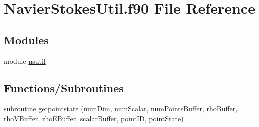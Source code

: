 \hypertarget{NavierStokesUtil_8f90}{}\section{Navier\+Stokes\+Util.\+f90 File Reference}
\label{NavierStokesUtil_8f90}
\subsection*{Modules}
\begin{DoxyCompactItemize}
\item 
module \hyperlink{namespacensutil}{nsutil}
\end{DoxyCompactItemize}
\subsection*{Functions/\+Subroutines}
\begin{DoxyCompactItemize}
\item 
subroutine \hyperlink{namespacensutil_a503864a1d099dac98243d4e3b7b3137b}{getpointstate} (\hyperlink{SATKernels_8H_a680185db8546de161968dabace9e94f1}{num\+Dim}, \hyperlink{SATKernels_8H_ac97409f480a745850ce5b215aabef12a}{num\+Scalar}, \hyperlink{WENOKernels_8H_a86c25ff33e6d9bccfabdf45dc5ddf24c}{num\+Points\+Buffer}, \hyperlink{WENOKernels_8H_a7f8551332dfedc9c12724ab3903db88c}{rho\+Buffer}, \hyperlink{WENOKernels_8H_aaddaafee4b407fa52d0756171ec50a51}{rho\+V\+Buffer}, \hyperlink{WENOKernels_8H_a355f99edd58be395aedbe083ffca12b0}{rho\+E\+Buffer}, \hyperlink{WENOKernels_8H_ae53b6c0ad2686009b00d987ad35f4810}{scalar\+Buffer}, \hyperlink{NSUtilKernels_8H_acde79891dbc4fd8e02d5c1ff00f990a5}{point\+ID}, \hyperlink{NSUtilKernels_8H_afef8a617804a12ae0e3b9a7f8a9cec81}{point\+State})
\end{DoxyCompactItemize}
